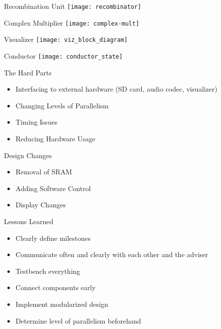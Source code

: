 \documentclass{beamer}
\begin{document}
\begin{frame}{Recombination Unit}
	\centering
	\texttt{[image: recombinator]}
\end{frame}

\begin{frame}{Complex Multiplier}
	\centering
	\texttt{[image: complex-mult]}
\end{frame}

\begin{frame}{Visualizer}
	\centering
	\texttt{[image: viz\_block\_diagram]}
\end{frame}

\begin{frame}{Conductor}
	\centering
    \texttt{[image: conductor\_state]}
\end{frame}

\begin{frame}{The Hard Parts}
	\begin{itemize}
		\item Interfacing to external hardware (SD card, audio codec, visualizer) 
		\item Changing Levels of Parallelism 
		\item Timing Issues
		\item Reducing Hardware Usage
	\end{itemize}
\end{frame}

\begin{frame}{Design Changes}
	\begin{itemize}
		\item Removal of SRAM
		\item Adding Software Control
		\item Display Changes
	\end{itemize}
\end{frame}

\begin{frame}{Lessons Learned}
	\begin{itemize}
		\item Clearly define milestones
		\item Communicate often and clearly with each other and the adviser
		\item Testbench everything
		\item Connect components early
		\item Implement modularized design
		\item Determine level of parallelism beforehand
	\end{itemize}
\end{frame}
\end{document}
